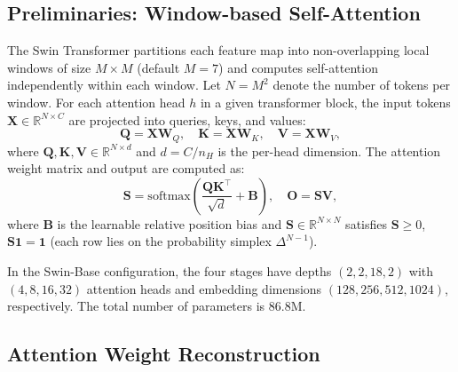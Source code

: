 \documentclass[review,12pt,authoryear]{elsarticle}
\begin{document}
\subsection{Preliminaries: Window-based Self-Attention}
\label{sec:method:prelim}

The Swin Transformer \citep{liu2021swin} partitions each feature map into non-overlapping local windows of size $M \times M$ (default $M=7$) and computes self-attention independently within each window.
Let $N = M^2$ denote the number of tokens per window.
For each attention head $h$ in a given transformer block, the input tokens $\mathbf{X} \in \mathbb{R}^{N \times C}$ are projected into queries, keys, and values:
\begin{equation}
    \mathbf{Q} = \mathbf{X}\mathbf{W}_Q, \quad
    \mathbf{K} = \mathbf{X}\mathbf{W}_K, \quad
    \mathbf{V} = \mathbf{X}\mathbf{W}_V,
    \label{eq:qkv}
\end{equation}
where $\mathbf{Q}, \mathbf{K}, \mathbf{V} \in \mathbb{R}^{N \times d}$ and $d = C / n_H$ is the per-head dimension.
The attention weight matrix and output are computed as:
\begin{equation}
    \mathbf{S} = \mathrm{softmax}\!\left(\frac{\mathbf{Q}\mathbf{K}^\top}{\sqrt{d}} + \mathbf{B}\right), \quad
    \mathbf{O} = \mathbf{S}\mathbf{V},
    \label{eq:attn}
\end{equation}
where $\mathbf{B}$ is the learnable relative position bias and $\mathbf{S} \in \mathbb{R}^{N \times N}$ satisfies $\mathbf{S} \geq 0$, $\mathbf{S}\mathbf{1} = \mathbf{1}$ (each row lies on the probability simplex $\Delta^{N-1}$).

In the Swin-Base configuration, the four stages have depths $(2, 2, 18, 2)$ with $(4, 8, 16, 32)$ attention heads and embedding dimensions $(128, 256, 512, 1024)$, respectively.
The total number of parameters is 86.8M.

\subsection{Attention Weight Reconstruction}
\label{sec:method:recon}
\end{document}
